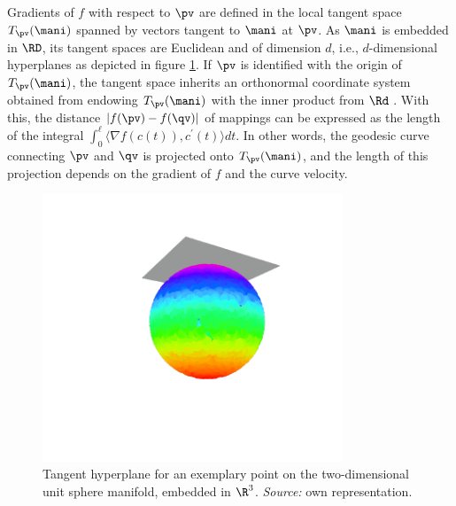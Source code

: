 \begin{minipage}[b]{0.65\textwidth}
  Gradients of $f$ with respect to $\pv$ are defined in the local tangent space
  $T_{\pv}(\mani)$ spanned by vectors tangent to $\mani$ at $\pv$.
  As $\mani$ is embedded in $\RD$, its tangent spaces are Euclidean and of 
  dimension $d$, i.e., $d$-dimensional hyperplanes \citep{sudderth2002} as 
  depicted in figure \ref{fig:sphere-tangent}.
  If $\pv$ is identified with the origin of $T_{\pv}(\mani)$, the tangent space
  inherits an orthonormal coordinate system obtained from endowing
  $T_{\pv}(\mani)$ with the inner product from $\Rd$ \citep{donohogrimes2003}.
  With this, the distance $|f(\pv) - f(\qv)|$ of mappings can be expressed as
  the length of the integral
  $\int_0^{\ell} \langle \nabla f(c(t)), c^{\prime}(t) \rangle dt$.
  In other words, the geodesic curve connecting $\pv$ and $\qv$ is projected 
  onto $T_{\pv}(\mani)$, and the length of this projection depends on the 
  gradient of $f$ and the curve velocity.
\end{minipage}
\begin{minipage}[b]{0.05\textwidth}
  \phantom{xxx}
\end{minipage}
\begin{minipage}[b]{0.3\textwidth}
  \begin{figure}[H]
    \centering
    \includegraphics[trim = 90 70 60 30, clip, %
      width = 0.8\textwidth]{figures/sphere-tangent}
    \caption[Tangent hyperplane for two-dimensional unit sphere]{Tangent 
    hyperplane for an exemplary point on the two-dimensional unit sphere 
    manifold, embedded in $\R^3$. \textit{Source:} own representation.}
    \label{fig:sphere-tangent}
  \end{figure}
\end{minipage}

